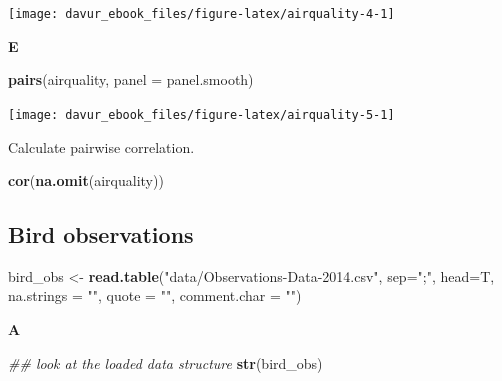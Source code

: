 \documentclass[]{book}
\newenvironment{Shaded}{\begin{snugshade}}{\end{snugshade}}
\newcommand{\CommentTok}[1]{\textcolor[rgb]{0.56,0.35,0.01}{\textit{#1}}}
\newcommand{\DataTypeTok}[1]{\textcolor[rgb]{0.13,0.29,0.53}{#1}}
\newcommand{\KeywordTok}[1]{\textcolor[rgb]{0.13,0.29,0.53}{\textbf{#1}}}
\newcommand{\NormalTok}[1]{#1}
\newcommand{\StringTok}[1]{\textcolor[rgb]{0.31,0.60,0.02}{#1}}
\begin{document}
\begin{center}\texttt{[image: davur\_ebook\_files/figure-latex/airquality-4-1]} \end{center}

\textbf{E}

\begin{Shaded}
\begin{Highlighting}[]
\KeywordTok{pairs}\NormalTok{(airquality, }\DataTypeTok{panel =}\NormalTok{ panel.smooth)}
\end{Highlighting}
\end{Shaded}

\begin{center}\texttt{[image: davur\_ebook\_files/figure-latex/airquality-5-1]} \end{center}

Calculate pairwise correlation.

\begin{Shaded}
\begin{Highlighting}[]
\KeywordTok{cor}\NormalTok{(}\KeywordTok{na.omit}\NormalTok{(airquality))}
\end{Highlighting}
\end{Shaded}

\hypertarget{bird-observations-1}{%
\subsection{Bird observations}\label{bird-observations-1}}

\begin{Shaded}
\begin{Highlighting}[]
\NormalTok{bird_obs <-}\StringTok{ }\KeywordTok{read.table}\NormalTok{(}\StringTok{"data/Observations-Data-2014.csv"}\NormalTok{, }
                                             \DataTypeTok{sep=}\StringTok{";"}\NormalTok{, }
                                             \DataTypeTok{head=}\NormalTok{T, }
                                             \DataTypeTok{na.strings =} \StringTok{""}\NormalTok{, }
                                             \DataTypeTok{quote =} \StringTok{""}\NormalTok{, }
                                             \DataTypeTok{comment.char =} \StringTok{""}\NormalTok{)}
\end{Highlighting}
\end{Shaded}

\textbf{A}

\begin{Shaded}
\begin{Highlighting}[]
\CommentTok{## look at the loaded data structure}
\KeywordTok{str}\NormalTok{(bird_obs)}
\end{Highlighting}
\end{Shaded}
\end{document}
